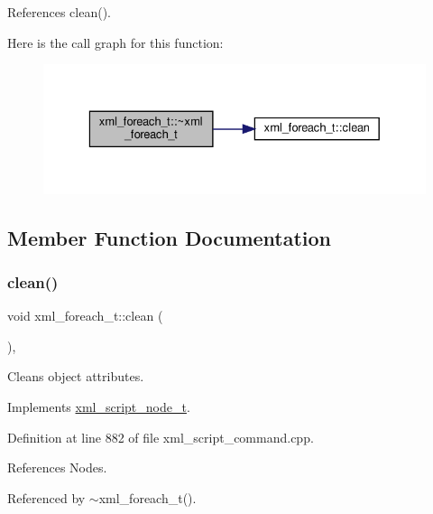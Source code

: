 References clean().

Here is the call graph for this function\+:
\nopagebreak
\begin{figure}[H]
\begin{center}
\leavevmode
\includegraphics[width=329pt]{d1/dc9/structxml__foreach__t_a9dc1c223543a6ecf0cd55846410b9f34_cgraph}
\end{center}
\end{figure}


\subsection{Member Function Documentation}
\mbox{\label{structxml__foreach__t_a62c4df007dbccbb16e471905c3a64826}} 
\subsubsection{\texorpdfstring{clean()}{clean()}}
{\footnotesize\ttfamily void xml\+\_\+foreach\+\_\+t\+::clean (\begin{DoxyParamCaption}{ }\end{DoxyParamCaption})\hspace{0.3cm}{\ttfamily [override]}, {\ttfamily [virtual]}}



Cleans object attributes. 



Implements \hyperlink{classxml__script__node__t_a2be778f2caef531c55b36c2bf2c996e2}{xml\+\_\+script\+\_\+node\+\_\+t}.



Definition at line 882 of file xml\+\_\+script\+\_\+command.\+cpp.



References Nodes.



Referenced by $\sim$xml\+\_\+foreach\+\_\+t().

